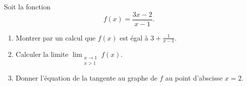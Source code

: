 
\begin{exercice}\label{exosmath-0286}

Soit la fonction
\begin{equation}
    f(x)=\frac{ 3x-2 }{ x-1 }.
\end{equation}
\begin{enumerate}
    \item
        Montrer par un calcul que \( f(x)\) est égal à \( 3+\frac{1}{ x-1 }\).
    \item
        Calculer la limite \( \lim_{\substack{x\to1\\x>1}} f(x)\).
    \item
        Donner l'équation de la tangente au graphe de \( f\) au point d'abscisse \( x=2\).
\end{enumerate}

\end{exercice}

